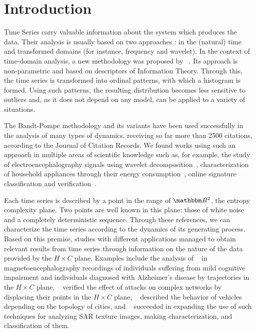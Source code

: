 \section{Introduction}\label{Sec:Intro}

Time Series carry valuable information about the system which produces the data.
Their analysis is usually based on two approaches \cite{TimeSeriesAnalysisCryerChan}: in the (natural) time and transformed domains (for instance, frequency and wavelet).
In the context of time-domain analysis, a new methodology was proposed by \citeauthor{PermutationEntropyBandtPompe}~.
Its approach is non-parametric and based on descriptors of Information Theory.
Through this, the time series is transformed into ordinal patterns, with which a histogram is formed.
Using such patterns, the resulting distribution becomes less sensitive to outliers and, as it does not depend on any model, can be applied to a variety of situations.

The Bandt-Pompe methodology and its variants have been used successfully in the analysis of many types of dynamics, receiving so far more than \num{2500} citations, according to the Journal of Citation Records.
We found works using such an approach in multiple areas of scientific knowledge such as, for example,
the study of electroencephalography signals using wavelet decomposition~\cite{EEGAnalysisWaveletInformationTools},
characterization of household appliances through their energy consumption~\cite{CharacterizationElectricLoadInformationTheoryQuantifiers},
 online signature classification and verification~\cite{ClassificationVerificationOnlineHandwrittenSignatures}.

Each time series is described by a point in the range of $\mathbbm R^2$, the entropy complexity plane.
Two points are well known in this plane: those of white noise and a completely deterministic sequence.
Through these references, we can characterize the time series according to the dynamics of its generating process.
Based on this premise, studies with different applications managed to obtain relevant results from time series through information on the nature of the data provided by the $H \times C$ plane.
Examples include the analysis of \citeauthor{echegoyen2020permutation}~ in magnetoencephalography recordings of individuals suffering from mild cognitive impairment and individuals diagnosed with Alzheimer's disease by trajectories in the $H \times C$ plane,
\citeauthor{InformationTheoryPerspectiveNetworkRobustness}~ verified the effect of attacks on complex networks by displacing their points in the $H \times C$ plane,
\citeauthor{CharacterizationVehicleBehaviorInformationTheory}~ described the behavior of vehicles depending on the topology of cities, and
\citeauthor{Chagas2020Characterization}~ succeeded in expanding the use of such techniques for analyzing SAR texture images, making characterization, and classification of them.



